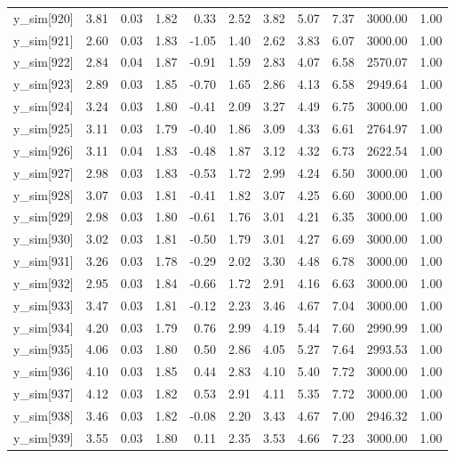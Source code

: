 \begin{table}[ht]
\begin{tabular}{rrrrrrrrrrr}
  y\_sim[920] & 3.81 & 0.03 & 1.82 & 0.33 & 2.52 & 3.82 & 5.07 & 7.37 & 3000.00 & 1.00 \\ 
  y\_sim[921] & 2.60 & 0.03 & 1.83 & -1.05 & 1.40 & 2.62 & 3.83 & 6.07 & 3000.00 & 1.00 \\ 
  y\_sim[922] & 2.84 & 0.04 & 1.87 & -0.91 & 1.59 & 2.83 & 4.07 & 6.58 & 2570.07 & 1.00 \\ 
  y\_sim[923] & 2.89 & 0.03 & 1.85 & -0.70 & 1.65 & 2.86 & 4.13 & 6.58 & 2949.64 & 1.00 \\ 
  y\_sim[924] & 3.24 & 0.03 & 1.80 & -0.41 & 2.09 & 3.27 & 4.49 & 6.75 & 3000.00 & 1.00 \\ 
  y\_sim[925] & 3.11 & 0.03 & 1.79 & -0.40 & 1.86 & 3.09 & 4.33 & 6.61 & 2764.97 & 1.00 \\ 
  y\_sim[926] & 3.11 & 0.04 & 1.83 & -0.48 & 1.87 & 3.12 & 4.32 & 6.73 & 2622.54 & 1.00 \\ 
  y\_sim[927] & 2.98 & 0.03 & 1.83 & -0.53 & 1.72 & 2.99 & 4.24 & 6.50 & 3000.00 & 1.00 \\ 
  y\_sim[928] & 3.07 & 0.03 & 1.81 & -0.41 & 1.82 & 3.07 & 4.25 & 6.60 & 3000.00 & 1.00 \\ 
  y\_sim[929] & 2.98 & 0.03 & 1.80 & -0.61 & 1.76 & 3.01 & 4.21 & 6.35 & 3000.00 & 1.00 \\ 
  y\_sim[930] & 3.02 & 0.03 & 1.81 & -0.50 & 1.79 & 3.01 & 4.27 & 6.69 & 3000.00 & 1.00 \\ 
  y\_sim[931] & 3.26 & 0.03 & 1.78 & -0.29 & 2.02 & 3.30 & 4.48 & 6.78 & 3000.00 & 1.00 \\ 
  y\_sim[932] & 2.95 & 0.03 & 1.84 & -0.66 & 1.72 & 2.91 & 4.16 & 6.63 & 3000.00 & 1.00 \\ 
  y\_sim[933] & 3.47 & 0.03 & 1.81 & -0.12 & 2.23 & 3.46 & 4.67 & 7.04 & 3000.00 & 1.00 \\ 
  y\_sim[934] & 4.20 & 0.03 & 1.79 & 0.76 & 2.99 & 4.19 & 5.44 & 7.60 & 2990.99 & 1.00 \\ 
  y\_sim[935] & 4.06 & 0.03 & 1.80 & 0.50 & 2.86 & 4.05 & 5.27 & 7.64 & 2993.53 & 1.00 \\ 
  y\_sim[936] & 4.10 & 0.03 & 1.85 & 0.44 & 2.83 & 4.10 & 5.40 & 7.72 & 3000.00 & 1.00 \\ 
  y\_sim[937] & 4.12 & 0.03 & 1.82 & 0.53 & 2.91 & 4.11 & 5.35 & 7.72 & 3000.00 & 1.00 \\ 
  y\_sim[938] & 3.46 & 0.03 & 1.82 & -0.08 & 2.20 & 3.43 & 4.67 & 7.00 & 2946.32 & 1.00 \\ 
  y\_sim[939] & 3.55 & 0.03 & 1.80 & 0.11 & 2.35 & 3.53 & 4.66 & 7.23 & 3000.00 & 1.00 \\ 

\end{tabular}
\end{table}
